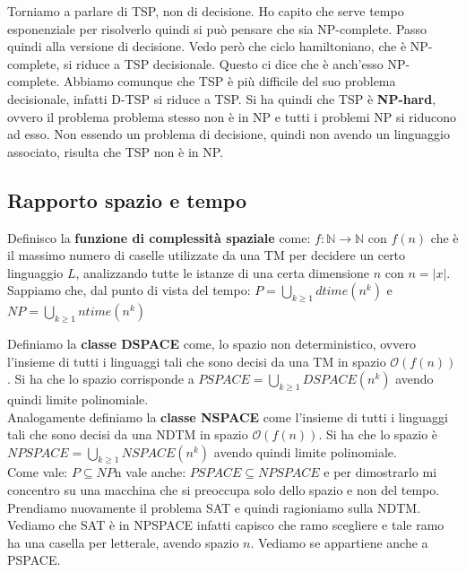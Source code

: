 Torniamo a parlare di TSP, non di decisione. Ho capito che serve tempo esponenziale per risolverlo quindi si può pensare che sia NP-complete. 
Passo quindi alla versione di decisione. Vedo però che ciclo hamiltoniano, che è NP-complete, si riduce a TSP decisionale. Questo ci dice che è anch'esso NP-complete. Abbiamo comunque che TSP è più difficile del suo problema decisionale, infatti D-TSP si riduce a TSP. Si ha quindi che TSP è \textbf{NP-hard}, ovvero il problema problema stesso non è in NP e tutti i problemi NP si riducono ad esso. Non essendo un problema di decisione, quindi non avendo un linguaggio associato, risulta che TSP non è in NP.

\subsection{Rapporto spazio e tempo}
Definisco la \textbf{funzione di complessità spaziale} come: $f:\mathbb{N} \to \mathbb{N}$ con $f(n)$ che è il massimo numero di caselle utilizzate da una TM per decidere un certo linguaggio $L$, analizzando tutte le istanze di una certa dimensione $n$ con $n=|x|$. Sappiamo che, dal punto di vista del tempo: $ P= \displaystyle \bigcup_{k\geq 1}dtime(n^k)$ e $ NP=\displaystyle  \bigcup_{k\geq 1}ntime(n^k)$

Definiamo la \textbf{classe DSPACE} come, lo spazio non deterministico, ovvero l'insieme di tutti i linguaggi tali che sono decisi da una TM in spazio $\mathcal{O}(f(n))$. Si ha che lo spazio corrisponde a $PSPACE=\displaystyle \bigcup_{k\geq 1}DSPACE(n^k)$ avendo quindi limite polinomiale.\\
 
Analogamente definiamo la \textbf{classe NSPACE} come l'insieme di tutti i linguaggi tali che sono decisi da una NDTM in spazio $\mathcal{O}(f(n))$. Si ha che lo spazio è $NPSPACE=\displaystyle \bigcup_{k\geq 1}NSPACE(n^k)$ avendo quindi limite polinomiale.\\

Come vale: $P\subseteq NP$n vale anche: $PSPACE\subseteq NPSPACE$ e per dimostrarlo mi concentro su una macchina che si preoccupa solo dello spazio
e non del tempo.\\

Prendiamo nuovamente il problema SAT e quindi ragioniamo sulla NDTM. Vediamo che SAT è in NPSPACE infatti capisco che ramo scegliere e tale ramo ha una casella per letterale, avendo spazio $n$. Vediamo se appartiene anche a PSPACE. \\

